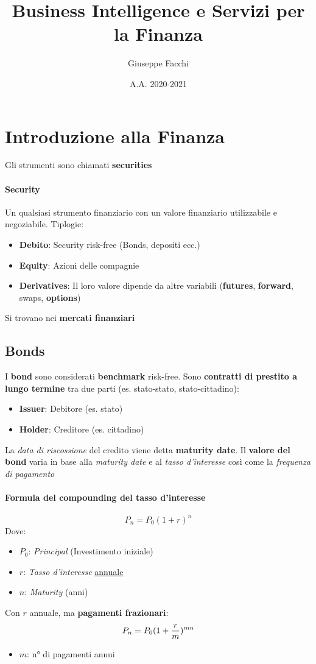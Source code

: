 \documentclass[12pt]{article}
\title{Business Intelligence e Servizi per la Finanza}
\author{Giuseppe Facchi}
\date{A.A. 2020-2021}
\begin{document}
\maketitle
\newpage
\tableofcontents
\newpage

\section{Introduzione alla Finanza}
Gli strumenti sono chiamati \textbf{securities}
\paragraph{Security} Un qualsiasi strumento finanziario con un valore finanziario utilizzabile e negoziabile. Tiplogie:
\begin{itemize}
    \item \textbf{Debito}: Security risk-free (Bonds, depositi ecc.)
    \item \textbf{Equity}: Azioni delle compagnie
    \item \textbf{Derivatives}: Il loro valore dipende da altre variabili (\textbf{futures}, \textbf{forward}, swaps, \textbf{options})
\end{itemize}
Si trovano nei \textbf{mercati finanziari}
\subsection{Bonds}
I \textbf{bond} sono considerati \textbf{benchmark} risk-free. Sono \textbf{contratti di prestito a lungo termine} tra due parti (es. stato-stato, stato-cittadino):
\begin{itemize}
    \item \textbf{Issuer}: Debitore (es. stato)
    \item \textbf{Holder}: Creditore (es. cittadino)
\end{itemize}
La \textit{data di riscossione} del credito viene detta \textbf{maturity date}. Il \textbf{valore del bond} varia in base alla \textit{maturity date} e al \textit{tasso d'interesse} così come la \textit{frequenza di pagamento}
\paragraph{Formula del compounding del tasso d'interesse}
$$P_n=P_0(1+r)^n$$
Dove:
\begin{itemize}[label=]
    \item $P_{0}$: \textit{Principal} (Investimento iniziale)
    \item $r$: \textit{Tasso d'interesse} \underline{annuale}
    \item $n$: \textit{Maturity} (anni)
\end{itemize}
Con $r$ annuale, ma \textbf{pagamenti frazionari}:
$$P_n=P_0(1+{r\over m})^{mn}$$
\begin{itemize}[label=]
    \item $m$: n° di pagamenti annui
\end{itemize}
\end{document}
